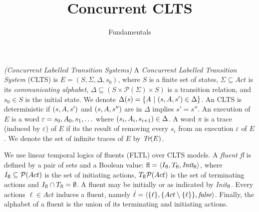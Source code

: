 \documentclass{article}
\title{Concurrent CLTS} %
\author{Fundamentals} %
\date{}
\begin{document}
\maketitle

\setcounter{section}{1} %
\setcounter{theorem}{1} %

\begin{definition}
	\label{def:CLTS} \emph{(Concurrent Labelled Transition Systems)} 
	A \emph{Concurrent Labelled Transition System} (CLTS) is $E =  (S, \Sigma, \Delta, s_0)$, where $S$ is a finite set of states, $\Sigma \subseteq Act$ is its {\em communicating alphabet}, $\Delta \subseteq (S \times \mathcal{P}(\Sigma) \times S)$ is a transition relation, and $s_0 \in S$ is the initial state.  We denote $\Delta(s)=\{A~|~(s,A,s') \in \Delta\}$. 
	An CLTS is deterministic if $(s,A,s')$ and $(s,A,s'')$ are in $\Delta$ implies $s'=s''$.
	An execution of $E$ is a word $\varepsilon=s_0, A_0, s_1, \ldots$ where $(s_i, A_i, s_{i+1}) \in \Delta$. 
	A word $\pi$ is a trace (induced by $\varepsilon$) of $E$ if its the result of removing every $s_i$ from an execution $\varepsilon$ of $E$. 
	We denote the set of infinite traces of $E$ by $\emph{Tr}(E)$. 
\end{definition}

We use linear temporal logics of fluents (FLTL) over CLTS models. %
A \emph{fluent} \emph{fl} is defined by a pair of sets and a Boolean value: $\emph{\emph{fl}} = \langle I_{\emph{\emph{fl}}}, T_{\emph{\emph{fl}}}, \emph{Init}_{\emph{\emph{fl}}} \rangle$, where $I_{\emph{\emph{fl}}}\subseteq \mathcal{P}(Act)$ is the set of initiating actions, $T_{\emph{\emph{fl}}} \mathcal{P}(Act)$ is the set of terminating actions and $I_{\emph{\emph{fl}}}\cap T_{\emph{\emph{fl}}}=\emptyset$. 
A fluent may be initially \true or \false as indicated by \emph{Init}$_{\emph{\emph{fl}}}$. 
Every actions $\ell\in Act$ induces a fluent, namely $\dot{\ell}=\langle \{\ell\}, \{Act\setminus \{\ell\}\}, \emph{false}\rangle$. 
Finally, the alphabet of a fluent is the union of its terminating and initiating actions.
\end{document}
